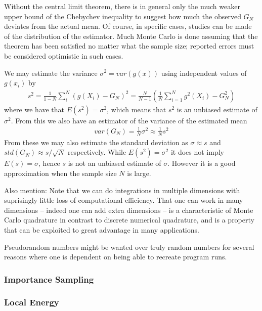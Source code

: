 \documentclass[twoside,english]{uiofysmaster}
\begin{document}
Without the central limit theorem, there is in general only the much weaker upper bound of the Chebychev inequality to suggest how much the observed $G_N$ deviates from the actual mean. Of course, in specific cases, studies can be made of the distribution of the estimator. Much Monte Carlo is done assuming that the theorem has been satisfied no matter what the sample size; reported errors must be considered optimistic in such cases.


We may estimate the variance $\sigma^2 = var(g(x))$ using independent values of $g(x_i)$ by
\begin{align}
	s^2 = \frac{1}{1-N} \sum_i^N (g(X_i) - G_N)^2 = \frac{N}{N-1} (  \frac{1}{N} \sum_{i=1}^N g^2(X_i) - G_N^2  )
\end{align}
where we have that $E(s^2) = \sigma^2 $, which means that $s^2$ is an unbiased estimate of $\sigma^2$. From this we also have an estimator of the variance of the estimated mean
\begin{align}
	var(G_N) = \frac{1}{N} \sigma^2 \approx \frac{1}{N} s^2
\end{align}
From these we may also estimate the standard deviation as $\sigma \approx s$ and $std(G_N) \approx s/\sqrt{N}$ respectively. While $E(s^2) = \sigma^2$ it does not imply $E(s) = \sigma$, hence $s$ is not an unbiased estimate of $\sigma$. However it is a good approximation when the sample size $N$ is large.

Also mention:
Note that we can do integrations in multiple dimensions with suprisingly little loss of computational efficiency. That one can work in many dimensions – indeed one can add extra dimensions – is a characteristic of Monte Carlo quadrature in contrast to discrete numerical quadrature, and is a property that can be exploited to great advantage in many applications.


Pseudorandom numbers might be wanted over truly random numbers for several reasons where one is dependent on being able to recreate program runs.

\subsubsection{Importance Sampling}



\subsubsection{Local Energy}
\end{document}
